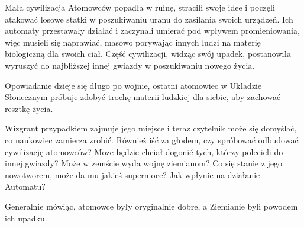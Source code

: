 Mała cywilizacja Atomowców popadła w ruinę, stracili swoje idee i poczęli atakować losowe statki w poszukiwaniu uranu do zasilania swoich urządzeń. 
Ich automaty przestawały działać i zaczynali umierać pod wpływem promieniowania, więc musieli się naprawiać, masowo porywając innych ludzi na materię biologiczną dla swoich ciał. Część cywilizacji, widząc swój upadek, postanowiła wyruszyć do najbliższej innej gwiazdy w poszukiwaniu nowego życia.

Opowiadanie dzieje się długo po wojnie, ostatni atomowiec w Układzie Słonecznym próbuje zdobyć trochę materii ludzkiej dla siebie, aby zachować resztkę życia.

Wizgrant przypadkiem zajmuje jego miejsce i teraz czytelnik może się domyślać, co naukowiec zamierza zrobić. 
Również iść za głodem, czy spróbować odbudować cywilizację atomowców? 
Może będzie chciał dogonić tych, którzy polecieli do innej gwiazdy? 
Może w zemście wyda wojnę ziemianom? 
Co się stanie z jego nowotworem, może da mu jakieś supermoce? Jak wpłynie na działanie Automatu?

Generalnie mówiąc, atomowce były oryginalnie dobre, a Ziemianie byli powodem ich upadku.

